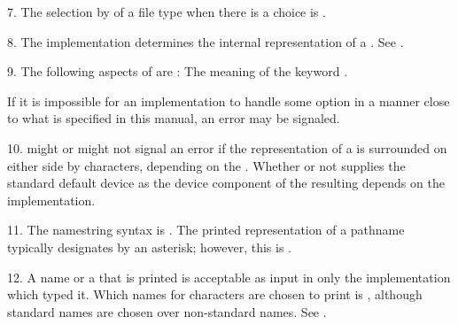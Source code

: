 \item{7.} The selection by  of a file type when there
is a choice is .

\item{8.} The implementation determines the internal representation
of a . See .

\item{9.} The following aspects of 
are :
\beginlist
{} The meaning of the keyword .

 If it is impossible for an implementation to handle some option
in a manner close to what is specified in this manual, an error may be
signaled.
\endlist                                             

\item{10.} 
might or might not signal an error if
the representation of a  
is surrounded on either side by
 characters, depending on the .
Whether or not  supplies 
the
standard default device as the device component
of the resulting  depends on the implementation.

\item{11.} The  namestring
syntax is .
The printed representation of a pathname
typically designates  by an asterisk; however, this is
.    

\item{12.} A  name or a  that is printed
is acceptable as input in only the implementation which typed it.  
Which names for characters are chosen to print is
, although standard names are
chosen over non-standard names. See .
        
